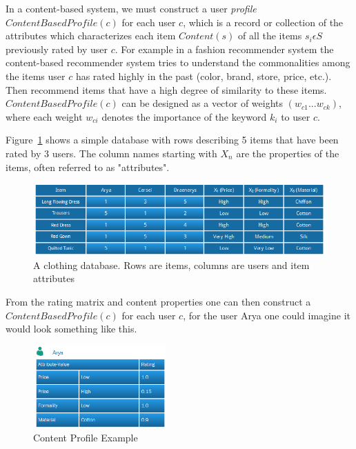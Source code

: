 In a content-based system, we must construct a user \emph{profile}
$ContentBasedProfile(c)$ for each user $c$, which is a record or collection of
the attributes which characterizes each item $Content(s)$ of all the items
$s_{i} \epsilon S$ previously rated by user $c$. For example in a fashion
recommender system the content-based recommender system tries to understand the
commonalities among the items user $c$ has rated highly in the past (color,
brand, store, price, etc.). Then recommend items that have a high degree of
similarity to these items. $ContentBasedProfile(c)$ can be designed as a vector
of weights $(w_{c1} ... w_{ck})$, where each weight $w_{ci}$ denotes the
importance of the keyword $k_{i}$ to user $c$.

Figure~\ref{figure:contentbaseddb} shows a simple database with rows
describing 5 items that have been rated by 3 users. The column names starting
with $X_{n}$ are the properties of the items, often referred to as
"attributes".

\begin{figure}[H]
    \includegraphics[width=5in]{image/contentbaseddb.png}
    \centering
    \caption[A clothing database]{A clothing database. Rows are items, columns are users and item attributes}
    \label{figure:contentbaseddb}
\end{figure}

From the rating matrix and content properties one can then construct a
$ContentBasedProfile(c)$ for each user $c$, for the user Arya one could imagine
it would look something like this.

\begin{figure}[H]
    \includegraphics[width=2in]{image/contentprofile.png}
    \centering
    \caption[Content Profile Example]{Content Profile Example}
    \label{figure:contentprofile}
\end{figure}

